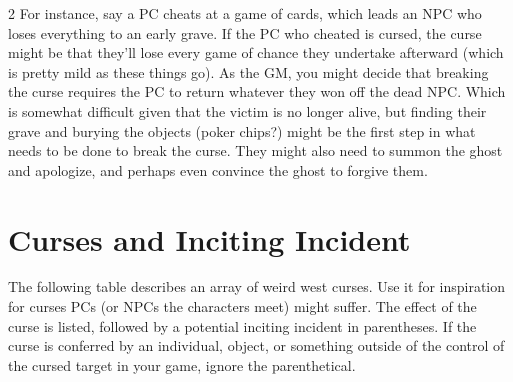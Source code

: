 \begin{multicols}{2}
For instance, say a PC cheats at a game of cards, which leads an NPC who loses everything to an early grave. If the PC who cheated is cursed, the curse might be that they’ll lose every game of chance they undertake afterward (which is pretty mild as these things go). As the GM, you might decide that breaking the curse requires the PC to return whatever they won off the dead NPC. Which is somewhat difficult given that the victim is no longer alive, but finding their grave and burying the objects (poker chips?) might be the first step in what needs to be done to break the curse. They might also need to summon the ghost and apologize, and perhaps even convince the ghost to forgive them.

\section{Curses and Inciting Incident}

The following table describes an array of weird west curses. Use it for inspiration for curses PCs (or NPCs the characters meet) might suffer. The effect of the curse is listed, followed by a potential inciting incident in parentheses. If the curse is conferred by an individual, object, or something outside of the control of the cursed target in your game, ignore the parenthetical.  

\end{multicols}

